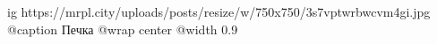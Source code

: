  
 
 
 
 

\ifcmt
  ig https://mrpl.city/uploads/posts/resize/w/750x750/3s7vptwrbwcvm4gi.jpg
	@caption Печка
  @wrap center
  @width 0.9
\fi
